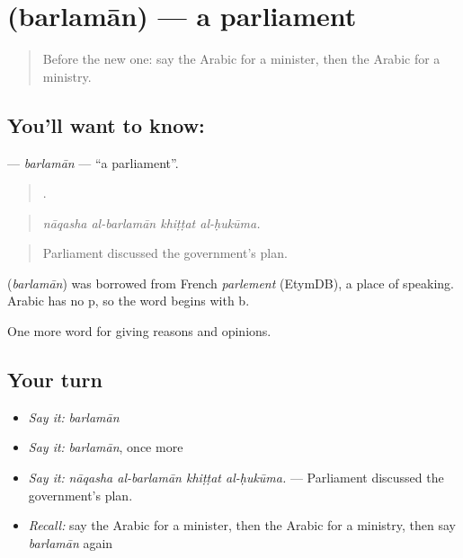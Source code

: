 \section[\texorpdfstring{\ar{برلمان} (barlamān)}{برلمان (barlamān)}]{ (barlamān) — a parliament}

\label{lesson:AR-C377-barlaman}



\begin{quote}
Before the new one: say the Arabic for a minister, then the Arabic for a ministry.
\end{quote}

\subsection*{You'll want to know: }
\textbf{} — \emph{barlamān} — \textquotedblleft{}a parliament\textquotedblright{}.

\begin{quote}
   .
\end{quote}

\begin{quote}
\emph{nāqasha al-barlamān khiṭṭat al-ḥukūma.}
\end{quote}

\begin{quote}
Parliament discussed the government's plan.
\end{quote}

\begin{cousinweb}
\textbf{} (\emph{barlamān}) was borrowed from French \emph{parlement} (EtymDB), a place of speaking. Arabic has no p, so the word begins with b.
\end{cousinweb}

\begin{grammarlens}[title={What you've built}]
One more word for giving reasons and opinions.
\end{grammarlens}

\subsection*{Your turn}
\begin{itemize}
\raggedright
  \item \emph{Say it:} \emph{barlamān}
  \item \emph{Say it:} \emph{barlamān}, once more
  \item \emph{Say it:} \emph{nāqasha al-barlamān khiṭṭat al-ḥukūma.} — Parliament discussed the government's plan.
  \item \emph{Recall:} say the Arabic for a minister, then the Arabic for a ministry, then say \emph{barlamān} again
\end{itemize}

